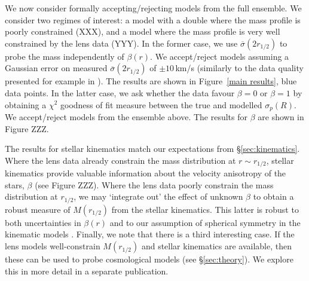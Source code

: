\documentclass[galley,usenatbib]{mn2e}
\newcommand{\figref}[1] {Figure~\ref{#1}}
\begin{document}
We now consider formally accepting/rejecting models from the full ensemble. We
consider two regimes of interest: a model with a double where the mass profile
is poorly constrained (XXX), and a model where the mass profile is very well
constrained by the lens data (YYY). In the former case, we use
$\overline{\sigma}(2 r_{1/2})$ to probe the mass independently of $\beta(r)$.
We accept/reject models assuming a Gaussian error on measured
$\overline{\sigma}(2 r_{1/2})$ of $\pm 10$\,km/s (similarly to the data quality
presented for example in \citealt{2002MNRAS.337L...6T}). The results are shown
in \figref{main results}, blue data points. In the latter case, we ask whether
the data favour $\beta = 0$ or $\beta = 1$ by obtaining a $\chi^2$ goodness of
fit measure between the true and modelled $\sigma_p(R)$. We accept/reject
models from the ensemble above. The results for $\beta$ are shown in Figure
ZZZ. 

The results for stellar kinematics match our expectations from
\S\ref{sec:kinematics}. Where the lens data already constrain the mass
distribution at $r \sim r_{1/2}$, stellar kinematics provide valuable
information about the velocity anisotropy of the stars, $\beta$ (see Figure
ZZZ). Where the lens data poorly constrain the mass distribution at $r_{1/2}$,
we may `integrate out' the effect of unknown $\beta$ to obtain a robust measure
of $M(r_{1/2})$ from the stellar kinematics. This latter is robust to both
uncertainties in $\beta(r)$ and to our assumption of spherical symmetry in the
kinematic models \citep{2012ApJ...754L..39A}. Finally, we note that there is a
third interesting case. If the lens models well-constrain $M(r_{1/2})$ and
stellar kinematics are available, then these can be used to probe cosmological
models (see \S\ref{sec:theory}). We explore this in more detail in a separate
publication. 
\end{document}
